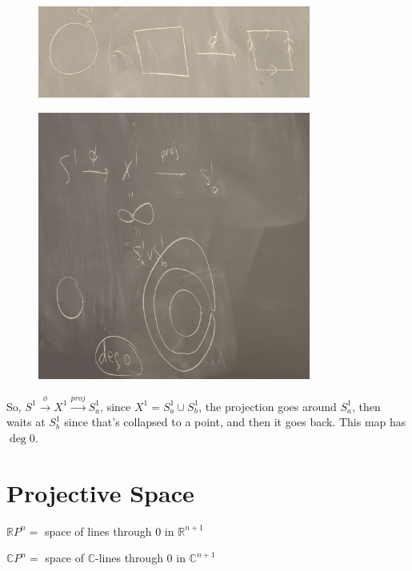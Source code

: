 \documentclass{article}
\theoremstyle{definition}
\begin{document}
    \begin{figure}[H]
        \centering
        \includegraphics[width=0.8\textwidth]{img/S1map.jpg}
        \caption{}
        \label{fig:}
    \end{figure}

    \begin{figure}[H]
        \centering
        \includegraphics[width=0.8\textwidth]{img/deg0.jpg}
        \caption{}
        \label{fig:}
    \end{figure}

    So, \(S^1 \xrightarrow{\phi} X^1 \xrightarrow{proj} S_a^1\), since \(X^1 = S_a^1 \cup S_b^1\), the projection goes around \(S_a^1\), then waits at \(S_b^1\) since that's collapsed to a point, and then it goes back. This map has \(\deg 0\).  

    \section*{Projective Space}

    \(\mathbb{R} P^n =\) space of lines through \(0\) in \(\mathbb{R}^{n+1}\)
    
    \(\mathbb{C}P^n =\) space of \(\mathbb{C}\)-lines through \(0\) in \(\mathbb{C}^{n+1}\)
\end{document}
